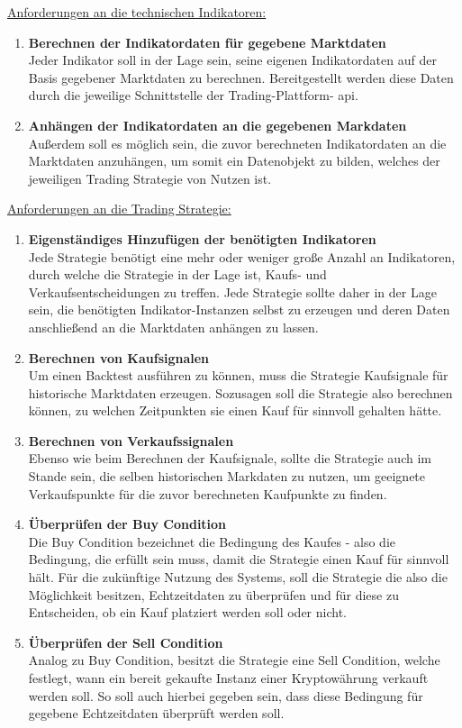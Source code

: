 \documentclass[oneside]{ausarbeitung}
\begin{document}
\underline{Anforderungen an die technischen Indikatoren:}
\begin{enumerate}
	\item \textbf{Berechnen der Indikatordaten für gegebene Marktdaten} \\
		Jeder Indikator soll in der Lage sein, seine eigenen Indikatordaten
		auf der Basis gegebener Marktdaten zu berechnen. Bereitgestellt werden
		diese Daten durch die jeweilige Schnittstelle der Trading-Plattform-
		\ac{api}. 
	\item \textbf{Anhängen der Indikatordaten an die gegebenen Markdaten} \\
		Außerdem soll es möglich sein, die zuvor berechneten Indikatordaten an
		die Marktdaten anzuhängen, um somit ein Datenobjekt zu bilden, welches
		der jeweiligen Trading Strategie von Nutzen ist. \\
\end{enumerate}

\underline{Anforderungen an die Trading Strategie:}
\begin{enumerate}
	\item \textbf{Eigenständiges Hinzufügen der benötigten Indikatoren} \\
		Jede Strategie benötigt eine mehr oder weniger große Anzahl an
		Indikatoren, durch welche die Strategie in der Lage ist, Kaufs- und
		Verkaufsentscheidungen zu treffen. Jede Strategie sollte daher in der
		Lage sein, die benötigten Indikator-Instanzen selbst zu erzeugen und
		deren Daten anschließend an die Marktdaten anhängen zu lassen.
	\item \textbf{Berechnen von Kaufsignalen} \\
		Um einen Backtest ausführen zu können, muss die Strategie Kaufsignale 
		für historische Marktdaten erzeugen. Sozusagen soll die Strategie also 
		berechnen können, zu welchen Zeitpunkten sie
		einen Kauf für sinnvoll gehalten hätte.
	\item \textbf{Berechnen von Verkaufssignalen} \\
		Ebenso wie beim Berechnen der Kaufsignale, sollte die Strategie auch
		im Stande sein, die selben historischen Markdaten zu nutzen, um
		geeignete Verkaufspunkte für die zuvor berechneten Kaufpunkte zu finden.
	\item \textbf{Überprüfen der Buy Condition} \\
		Die Buy Condition bezeichnet die Bedingung des Kaufes - also die
		Bedingung, die erfüllt sein muss, damit die Strategie einen Kauf für
		sinnvoll hält. Für die zukünftige Nutzung des Systems, soll die 
		Strategie die also die Möglichkeit besitzen, Echtzeitdaten zu überprüfen 
		und für diese zu Entscheiden, ob ein Kauf platziert werden soll oder 
		nicht. 
	\item \textbf{Überprüfen der Sell Condition} \\
		Analog zu Buy Condition, besitzt die Strategie eine Sell Condition,
		welche festlegt, wann ein bereit gekaufte Instanz einer Kryptowährung
		verkauft werden soll. So soll auch hierbei gegeben sein, dass diese
		Bedingung für gegebene Echtzeitdaten überprüft werden soll.
\end{enumerate}
\end{document}
